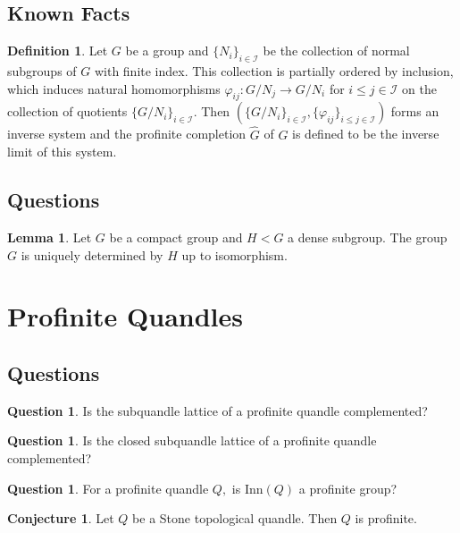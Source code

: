\documentclass[reqno,dvipsnames]{amsart}
\let\mc\mathcal
\newcommand{\Inn}{\text{Inn}}
\theoremstyle{definition}
\newtheorem{lemma}[theorem]{Lemma}
\newtheorem{definition}[theorem]{Definition}
\newtheorem{question}[theorem]{Question}
\newtheorem{conjecture}[theorem]{Conjecture}
\begin{document}
{\subsection{Known Facts}

\begin{definition}
Let $G$ be a group and $\{N_i\}_{i \in \mc{I}}$ be the collection of normal subgroups of $G$ with finite index. This collection is partially ordered by inclusion, which induces natural homomorphisms $\varphi_{ij} : G/N_j \to G/N_i$ for $i \leq j \in \mc{I}$ on the collection of quotients $\{G/N_i\}_{i \in \mc{I}}$. Then $(\{G/N_i\}_{i \in \mc{I}},\{\varphi_{ij}\}_{i \leq j \in \mc{I}})$ forms an inverse system and the profinite completion $\hat{G}$ of $G$ is defined to be the inverse limit of this system.
\end{definition}

\subsection{Questions}

\begin{lemma}
Let $G$ be a compact group and $H<G$ a dense subgroup. The group $G$ is uniquely determined by $H$ up to isomorphism.
\end{lemma}

\newpage

\section{Profinite Quandles}

\subsection{Questions}

\begin{question}
    Is the subquandle lattice of a profinite quandle complemented?
\end{question}

\begin{question}
    Is the closed subquandle lattice of a profinite quandle complemented?
\end{question}

\begin{question}
    For a profinite quandle $Q,$ is $\Inn(Q)$ a profinite group?
\end{question}

\begin{conjecture}
Let $Q$ be a Stone topological quandle. Then $Q$ is profinite.
\end{conjecture}

}
\end{document}
